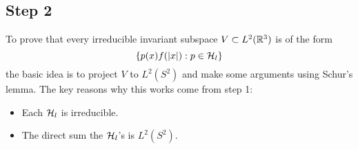 \subsection{Step 2}
To prove that every irreducible invariant subspace $V \subset L^2({\mathbb R}^3)$ is of the form
\[
    \{p(x)f(|x|): p \in {\mathcal H}_l\}
\]
the basic idea is to project $V$ to $L^2(S^2)$ and make some arguments using Schur's lemma. The key reasons why this works come from step 1:
\begin{itemize}
    \item Each ${\mathcal H}_l$ is irreducible.
    \item The direct sum the ${\mathcal H}_l$'s is $L^2(S^2)$.
\end{itemize}
